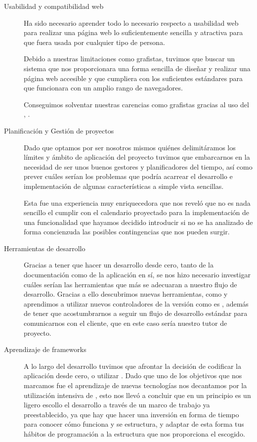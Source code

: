 \begin{description}
\item [Usabilidad y compatibilidad web] Ha sido necesario aprender todo lo
  necesario respecto a usabilidad web para realizar una página web lo
  suficientemente sencilla y atractiva para que fuera usada por cualquier tipo
  de persona.

  Debido a nuestras limitaciones como grafistas, tuvimos que buscar un sistema
  que nos proporcionara una forma sencilla de diseñar y realizar una página web
  accesible y que cumpliera con los suficientes estándares para que funcionara
  con un amplio rango de navegadores.

  Conseguimos solventar nuestras carencias como grafistas gracias al uso del
  , .
\item [Planificación y Gestión de proyectos] Dado que optamos por ser nosotros
  mismos quiénes delimitáramos los límites y ámbito de aplicación del proyecto
  tuvimos que embarcarnos en la necesidad de ser unos buenos gestores y
  planificadores del tiempo, así como prever cuáles serían los problemas que
  podría acarrear el desarrollo e implementación de algunas características a
  simple vista sencillas.

  Esta fue una experiencia muy enriquecedora que nos reveló que no es nada
  sencillo el cumplir con el calendario proyectado para la implementación de una
  funcionalidad que hayamos decidido introducir si no se ha analizado de forma
  concienzuda las posibles contingencias que nos pueden surgir.
\item [Herramientas de desarrollo] Gracias a tener que hacer un desarrollo desde
  cero, tanto de la documentación como de la aplicación en sí, se nos hizo
  necesario investigar cuáles serían las herramientas que más se adecuaran a
  nuestro flujo de desarrollo. Gracias a ello descubrimos nuevas herramientas,
  como  y aprendimos a utilizar nuevos controladores de la
  versión como es , además de tener que acostumbrarnos a seguir un
  flujo de desarrollo estándar para comunicarnos con el cliente, que en este
  caso sería nuestro tutor de proyecto.
\item [Aprendizaje de frameworks] A lo largo del desarrollo tuvimos que afrontar
  la decisión de codificar la aplicación desde cero, o utilizar
  . Dado que uno de los objetivos que nos marcamos fue el
  aprendizaje de nuevas tecnologías nos decantamos por la utilización intensiva
  de , esto nos llevó a concluir que en un principio es un
  ligero escollo el desarrollo a través de un marco de trabajo ya
  preestablecido, ya que hay que hacer una inversión en forma de tiempo para
  conocer cómo funciona y se estructura, y adaptar de esta forma tus hábitos de
  programación a la estructura que nos proporciona el  escogido.
\end{description}

